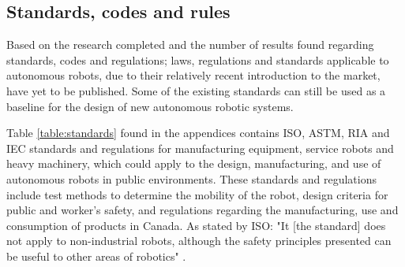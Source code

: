 \subsection{Standards, codes and rules}

Based on the research completed and the number of results found regarding standards, codes and regulations; laws, regulations and standards applicable to autonomous robots, due to their relatively recent introduction to the market, have yet to be published. Some of the existing standards can still be used as a baseline for the design of new autonomous robotic systems.

Table \ref{table:standards} found in the appendices contains ISO, ASTM, RIA and IEC standards and regulations for manufacturing equipment, service robots and heavy machinery,  which could apply to the design, manufacturing, and use of autonomous robots in public environments. These standards and regulations include test methods to determine the mobility of the robot, design criteria for public and worker's safety, and regulations regarding the manufacturing, use and consumption of products in Canada. As stated by ISO: "It [the standard] does not apply to non-industrial robots, although the safety principles presented can be useful to other areas of robotics" \cite{iso_iso/ts_nodate}.


